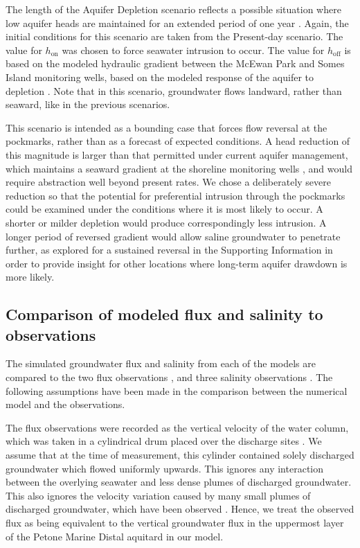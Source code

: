 \documentclass[draft, 10pt]{agujournal2019}
\begin{document}
The length of the Aquifer Depletion scenario reflects a possible situation where low aquifer heads are maintained for an extended period of one year \cite{gyopari_lower_2014}.
Again, the initial conditions for this scenario are taken from the Present-day scenario.
The value for $h_{\mathrm{on}}$ was chosen to force seawater intrusion to occur.
The value for $h_{\mathrm{off}}$ is based on the modeled hydraulic gradient between the McEwan Park and Somes Island monitoring wells, based on the modeled response of the aquifer to depletion \cite{gyopari_lower_2014}.
Note that in this scenario, groundwater flows landward, rather than seaward, like in the previous scenarios.

This scenario is intended as a bounding case that forces flow reversal at the pockmarks, rather than as a forecast of expected conditions.
A head reduction of this magnitude is larger than that permitted under current aquifer management, which maintains a seaward gradient at the shoreline monitoring wells \cite{gyopari_lower_2014},
and would require abstraction well beyond present rates.
We chose a deliberately severe reduction so that the potential for preferential intrusion through the pockmarks could be examined under the conditions where it is most likely to occur.
A shorter or milder depletion would produce correspondingly less intrusion.
A longer period of reversed gradient would allow saline groundwater to penetrate further, as explored for a sustained reversal in the Supporting Information in order to provide insight for other locations where long-term aquifer drawdown is more likely.

\subsection{Comparison of modeled flux and salinity to observations}
The simulated groundwater flux and salinity from each of the models are compared to the two flux observations \cite{harding_characteristics_2000},
and three salinity observations \cite{hoffmann_fresh_2023}. The following assumptions have been made in the comparison between the numerical model and the observations.

The flux observations were recorded as the vertical velocity of the water column,
which was taken in a cylindrical drum placed over the discharge sites \cite{harding_characteristics_2000}.
We assume that at the time of measurement, this cylinder contained solely discharged groundwater which flowed uniformly upwards.
This ignores any interaction between the overlying seawater and less dense plumes of discharged groundwater.
This also ignores the velocity variation caused by many small plumes of discharged groundwater, which have been observed \cite{harding_characteristics_2000}.
Hence, we treat the observed flux as being equivalent to the vertical groundwater flux in the uppermost layer of the Petone Marine Distal aquitard in our model.
\end{document}
